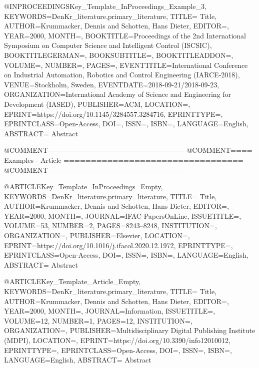 @INPROCEEDINGS{Key_Template_InProceedings_Example_3,
    KEYWORDS={DenKr_literature,primary_literature},
    TITLE={\begingroup
        Title\endgroup},
    AUTHOR={Krummacker, Dennis and Schotten, Hans Dieter},
    EDITOR={},
    YEAR={2000},
    MONTH={},
    BOOKTITLE={Proceedings of the 2nd International Symposium on Computer Science and Intelligent Control (ISCSIC)},
    BOOKTITLEGERMAN={},
    BOOKSUBTITLE={},
    BOOKTITLEADDON={},
    VOLUME={},
    NUMBER={},
    PAGES={},
    EVENTTITLE={International Conference on Industrial Automation, Robotics and Control Engineering (IARCE-2018)},
    VENUE={Stockholm, Sweden},
    EVENTDATE={2018-09-21/2018-09-23},
    ORGANIZATION={International Academy of Science and Engineering for Development (IASED)},
    PUBLISHER={ACM},
    LOCATION={},
    EPRINT={https://doi.org/10.1145/3284557.3284716},
    EPRINTTYPE={},
    EPRINTCLASS={Open-Access},
    DOI={},
    ISSN={},
    ISBN={},
    LANGUAGE={English},
    ABSTRACT={\begingroup
        Abstract\endgroup}
}



@COMMENT{-----------------------------------------------------------}
@COMMENT{====  Examples - Article  =================================}
@COMMENT{-----------------------------------------------------------}

@ARTICLE{Key_Template_InProceedings_Empty,
    KEYWORDS={DenKr_literature,primary_literature},
    TITLE={\begingroup
        Title\endgroup},
    AUTHOR={Krummacker, Dennis and Schotten, Hans Dieter},
    EDITOR={},
    YEAR={2000},
    MONTH={},
    JOURNAL={IFAC-PapersOnLine},
    ISSUETITLE={},
    VOLUME={53},
    NUMBER={2},
    PAGES={8243--8248},
    INSTITUTION={},
    ORGANIZATION={},
    PUBLISHER={Elsevier},
    LOCATION={},
    EPRINT={https://doi.org/10.1016/j.ifacol.2020.12.1972},
    EPRINTTYPE={},
    EPRINTCLASS={Open-Access},
    DOI={},
    ISSN={},
    ISBN={},
    LANGUAGE={English},
    ABSTRACT={\begingroup
        Abstract\endgroup}
}

@ARTICLE{Key_Template_Article_Empty,
    KEYWORDS={DenKr_literature,primary_literature},
    TITLE={\begingroup
        Title\endgroup},
    AUTHOR={Krummacker, Dennis and Schotten, Hans Dieter},
    EDITOR={},
    YEAR={2000},
    MONTH={},
    JOURNAL={Information},
    ISSUETITLE={},
    VOLUME={12},
    NUMBER={1},
    PAGES={12},
    INSTITUTION={},
    ORGANIZATION={},
    PUBLISHER={Multidisciplinary Digital Publishing Institute (MDPI)},
    LOCATION={},
    EPRINT={https://doi.org/10.3390/info12010012},
    EPRINTTYPE={},
    EPRINTCLASS={Open-Access},
    DOI={},
    ISSN={},
    ISBN={},
    LANGUAGE={English},
    ABSTRACT={\begingroup
        Abstract\endgroup}
}
